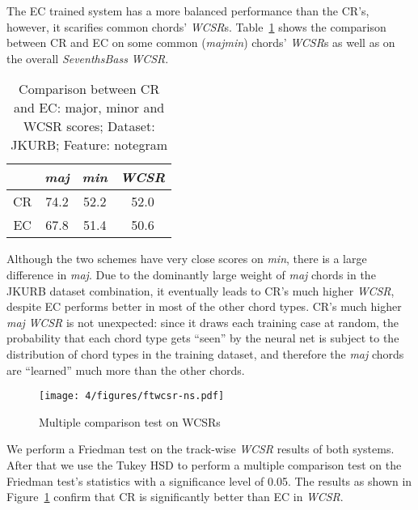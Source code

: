 The EC trained system has a more balanced performance than the CR's, however, it scarifies common chords' \textit{WCSR}s. Table~\ref{tab:4-wcsr-ns} shows the comparison between CR and EC on some common (\textit{majmin}) \cite{burgoyne2011expert} chords' \textit{WCSR}s as well as on the overall \textit{SeventhsBass} \textit{WCSR}.
\begin{table}[htb]
	\centering
	\scriptsize
	\begin{tabular}{|c|c|c|c|} \hline
		& \textit{maj} & \textit{min} & \textit{WCSR} \\ \hline
		CR & 74.2 & 52.2 & 52.0 \\ \hline
		EC &  67.8 & 51.4 & 50.6 \\ \hline
	\end{tabular}
	\caption{Comparison between CR and EC: major, minor and WCSR scores; Dataset: JKURB; Feature: notegram}
	\label{tab:4-wcsr-ns}
\end{table}

Although the two schemes have very close scores on \textit{min}, there is a large difference in \textit{maj}. Due to the dominantly large weight of \textit{maj} chords in the JKURB dataset combination, it eventually leads to CR's much higher \textit{WCSR}, despite EC performs better in most of the other chord types. CR's much higher \textit{maj} \textit{WCSR} is not unexpected: since it draws each training case at random, the probability that each chord type gets ``seen'' by the neural net is subject to the distribution of chord types in the training dataset, and therefore the \textit{maj} chords are ``learned'' much more than the other chords.

\begin{figure}[h!]
	\centering
	\texttt{[image: 4/figures/ftwcsr-ns.pdf]}
	\caption{Multiple comparison test on WCSRs}
	\label{fig:4-ftwcsr-ns}
\end{figure}
We perform a Friedman test on the track-wise \textit{WCSR} results of both systems. After that we use the Tukey HSD to perform a multiple comparison test on the Friedman test's statistics with a significance level of 0.05. The results as shown in Figure~\ref{fig:4-ftwcsr-ns} confirm that CR is significantly better than EC in \textit{WCSR}.

